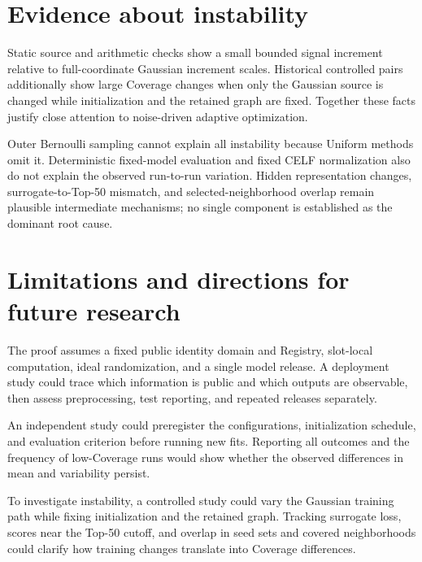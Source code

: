 \section{Evidence about instability}
Static source and arithmetic checks show a small bounded signal increment relative to full-coordinate Gaussian increment scales. Historical controlled pairs additionally show large Coverage changes when only the Gaussian source is changed while initialization and the retained graph are fixed. Together these facts justify close attention to noise-driven adaptive optimization.

Outer Bernoulli sampling cannot explain all instability because Uniform methods omit it. Deterministic fixed-model evaluation and fixed CELF normalization also do not explain the observed run-to-run variation. Hidden representation changes, surrogate-to-Top-50 mismatch, and selected-neighborhood overlap remain plausible intermediate mechanisms; no single component is established as the dominant root cause.

\section{Limitations and directions for future research}
The proof assumes a fixed public identity domain and Registry, slot-local computation, ideal randomization, and a single model release. A deployment study could trace which information is public and which outputs are observable, then assess preprocessing, test reporting, and repeated releases separately.

An independent study could preregister the configurations, initialization schedule, and evaluation criterion before running new fits. Reporting all outcomes and the frequency of low-Coverage runs would show whether the observed differences in mean and variability persist.

To investigate instability, a controlled study could vary the Gaussian training path while fixing initialization and the retained graph. Tracking surrogate loss, scores near the Top-50 cutoff, and overlap in seed sets and covered neighborhoods could clarify how training changes translate into Coverage differences.
